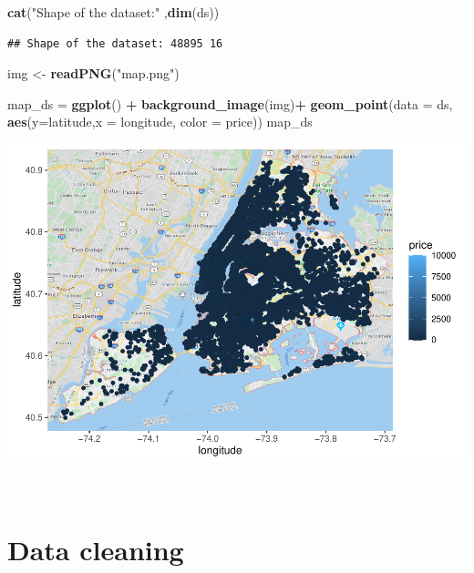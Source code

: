 \documentclass[
]{article}
\newenvironment{Shaded}{\begin{snugshade}}{\end{snugshade}}
\newcommand{\DataTypeTok}[1]{\textcolor[rgb]{0.13,0.29,0.53}{#1}}
\newcommand{\KeywordTok}[1]{\textcolor[rgb]{0.13,0.29,0.53}{\textbf{#1}}}
\newcommand{\NormalTok}[1]{#1}
\newcommand{\OperatorTok}[1]{\textcolor[rgb]{0.81,0.36,0.00}{\textbf{#1}}}
\newcommand{\StringTok}[1]{\textcolor[rgb]{0.31,0.60,0.02}{#1}}
\begin{document}
\begin{Shaded}
\begin{Highlighting}[]
\KeywordTok{cat}\NormalTok{(}\StringTok{"Shape of the dataset:"}\NormalTok{ ,}\KeywordTok{dim}\NormalTok{(ds))}
\end{Highlighting}
\end{Shaded}

\begin{verbatim}
## Shape of the dataset: 48895 16
\end{verbatim}

\begin{Shaded}
\begin{Highlighting}[]
\NormalTok{img <-}\StringTok{ }\KeywordTok{readPNG}\NormalTok{(}\StringTok{"map.png"}\NormalTok{)}


\NormalTok{map_ds =}\StringTok{ }\KeywordTok{ggplot}\NormalTok{() }\OperatorTok{+}\StringTok{ }\KeywordTok{background_image}\NormalTok{(img)}\OperatorTok{+}\StringTok{ }\KeywordTok{geom_point}\NormalTok{(}\DataTypeTok{data =}\NormalTok{ ds,  }\KeywordTok{aes}\NormalTok{(}\DataTypeTok{y=}\NormalTok{latitude,}\DataTypeTok{x =}\NormalTok{ longitude, }\DataTypeTok{color =}\NormalTok{ price)) }
\NormalTok{map_ds}
\end{Highlighting}
\end{Shaded}

\includegraphics{project-code_files/figure-latex/unnamed-chunk-5-1.pdf}

~~

\hypertarget{data-cleaning}{%
\section{Data cleaning}\label{data-cleaning}}
\end{document}
